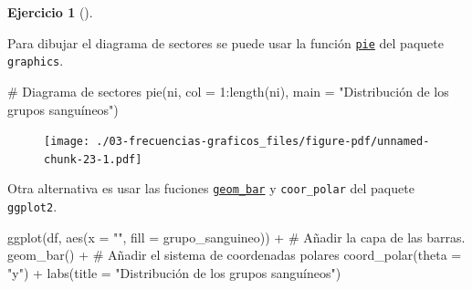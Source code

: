 \documentclass[
  a4paper,
]{scrreport}
\newenvironment{Shaded}{\begin{snugshade}}{\end{snugshade}}
\newcommand{\AttributeTok}[1]{\textcolor[rgb]{0.40,0.45,0.13}{#1}}
\newcommand{\CommentTok}[1]{\textcolor[rgb]{0.37,0.37,0.37}{#1}}
\newcommand{\DecValTok}[1]{\textcolor[rgb]{0.68,0.00,0.00}{#1}}
\newcommand{\FunctionTok}[1]{\textcolor[rgb]{0.28,0.35,0.67}{#1}}
\newcommand{\NormalTok}[1]{\textcolor[rgb]{0.00,0.23,0.31}{#1}}
\newcommand{\SpecialCharTok}[1]{\textcolor[rgb]{0.37,0.37,0.37}{#1}}
\newcommand{\StringTok}[1]{\textcolor[rgb]{0.13,0.47,0.30}{#1}}
\theoremstyle{definition}
\newtheorem{exercise}{Ejercicio}[chapter]
\theoremstyle{remark}
\begin{document}
\begin{exercise}[]
\begin{tcolorbox}
Para dibujar el diagrama de sectores se puede usar la función
\href{https://www.rdocumentation.org/packages/graphics/versions/3.6.2/topics/pie}{\texttt{pie}}
del paquete \texttt{graphics}.

\begin{Shaded}
\begin{Highlighting}[]
\CommentTok{\# Diagrama de sectores}
\FunctionTok{pie}\NormalTok{(ni, }\AttributeTok{col =} \DecValTok{1}\SpecialCharTok{:}\FunctionTok{length}\NormalTok{(ni), }\AttributeTok{main =} \StringTok{"Distribución de los grupos sanguíneos"}\NormalTok{)}
\end{Highlighting}
\end{Shaded}

\begin{figure}[H]

{\centering \texttt{[image: ./03-frecuencias-graficos\_files/figure-pdf/unnamed-chunk-23-1.pdf]}

}

\end{figure}

\end{tcolorbox}

\begin{tcolorbox}[enhanced jigsaw, rightrule=.15mm, toptitle=1mm, colbacktitle=quarto-callout-tip-color!10!white, titlerule=0mm, colback=white, leftrule=.75mm, bottomtitle=1mm, colframe=quarto-callout-tip-color-frame, breakable, title=\textcolor{quarto-callout-tip-color}{\faLightbulb}\hspace{0.5em}{Solución 2}, arc=.35mm, coltitle=black, opacityback=0, bottomrule=.15mm, opacitybacktitle=0.6, left=2mm, toprule=.15mm]

Otra alternativa es usar las fuciones
\href{https://aprendeconalf.es/manual-r/07-graficos.html\#diagrama-de-sectores}{\texttt{geom\_bar}}
y \texttt{coor\_polar} del paquete \texttt{ggplot2}.

\begin{Shaded}
\begin{Highlighting}[]
\FunctionTok{ggplot}\NormalTok{(df, }\FunctionTok{aes}\NormalTok{(}\AttributeTok{x =} \StringTok{""}\NormalTok{, }\AttributeTok{fill =}\NormalTok{ grupo\_sanguineo)) }\SpecialCharTok{+}
    \CommentTok{\# Añadir la capa de las barras.}
    \FunctionTok{geom\_bar}\NormalTok{() }\SpecialCharTok{+}
    \CommentTok{\# Añadir el sistema de coordenadas polares}
    \FunctionTok{coord\_polar}\NormalTok{(}\AttributeTok{theta =} \StringTok{"y"}\NormalTok{) }\SpecialCharTok{+}
    \FunctionTok{labs}\NormalTok{(}\AttributeTok{title =} \StringTok{"Distribución de los grupos sanguíneos"}\NormalTok{)}
\end{Highlighting}
\end{Shaded}


\end{tcolorbox}
\end{exercise}
\end{document}

